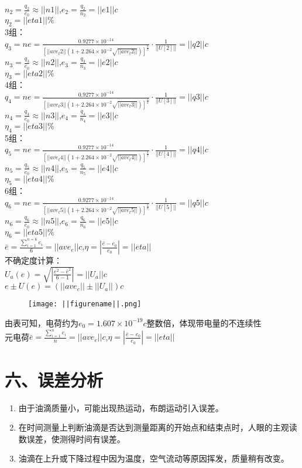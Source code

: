 \documentclass[11pt,a4paper,oneside]{article}
\begin{document}
\indent $n_2=\frac{q_2}{e_0}\approx||n1||$,\quad$e_2=\frac{q_2}{n_2}=||e1||c$\\
\indent $\eta_2=||eta1||\%$\\
3组：\\
\indent $q_{3}=ne=\frac{0.9277\times10^{-14}}
{\left[||ave_t2||\left(1+2.264\times10^{-2}\sqrt{||ave_t2||}\right)\right]^\frac{3}{2}}
\cdot\frac{1}{||U[2]||}=||q2||c$\\
\indent $n_3=\frac{q_3}{e_0}\approx||n2||$,\quad$e_3=\frac{q_3}{n_3}=||e2||c$\\
\indent $\eta_3=||eta2||\%$\\
4组：\\
\indent $q_{4}=ne=\frac{0.9277\times10^{-14}}
{\left[||ave_t3||\left(1+2.264\times10^{-2}\sqrt{||ave_t3||}\right)\right]^\frac{3}{2}}
\cdot\frac{1}{||U[3]||}=||q3||c$\\
\indent $n_4=\frac{q_4}{e_0}\approx||n3||$,\quad$e_4=\frac{q_4}{n_4}=||e3||c$\\
\indent $\eta_4=||eta3||\%$\\
5组：\\
\indent $q_{5}=ne=\frac{0.9277\times10^{-14}}
{\left[||ave_t4||\left(1+2.264\times10^{-2}\sqrt{||ave_t4||}\right)\right]^\frac{3}{2}}
\cdot\frac{1}{||U[4]||}=||q4||c$\\
\indent $n_5=\frac{q_5}{e_0}\approx||n4||$,\quad$e_5=\frac{q_5}{n_5}=||e4||c$\\
\indent $\eta_5=||eta4||\%$\\
6组：\\
\indent $q_{6}=ne=\frac{0.9277\times10^{-14}}
{\left[||ave_t5||\left(1+2.264\times10^{-2}\sqrt{||ave_t5||}\right)\right]^\frac{3}{2}}
\cdot\frac{1}{||U[5]||}=||q5||c$\\
\indent $n_6=\frac{q_6}{e_0}\approx||n5||$,\quad$e_6=\frac{q_6}{n_6}=||e5||c$\\
\indent $\eta_6=||eta5||\%$\\
$\bar{e}=\frac{\sum_{i=1}^{n=6} e_i}{6}=||ave_e||c$,\quad$\eta=|\frac{\bar{e}-e_0}{e_0}|=||eta||$\\
不确定度计算：\\
\indent $U_a(e)=\sqrt{|\frac{\bar{e^2}-\bar{e}^2}{6-1}|}=||U_a||c$\\
\indent $e±U(e)=\left(||ave_e||±||U_a||\right)c$\\
\begin{figure}[H]
\centering
  \texttt{[image: ||figurename||.png]}
\end{figure}
\indent 由表可知，电荷约为$e_0=1.607\times10^{-19}c$整数倍，体现带电量的不连续性\\
\indent 元电荷$\bar{e}=\frac{\sum_{i=1}^{n} e_i}{n}=||ave_e||c$,\quad$\eta=|\frac{\bar{e}-e_0}{e_0}|=||eta||$
\section*{六、误差分析}
\begin{enumerate}
\item 由于油滴质量小，可能出现热运动，布朗运动引入误差。
\item 在时间测量上判断油滴是否达到测量距离的开始点和结束点时，人眼的主观读数误差，使测得时间有误差。
\item 油滴在上升或下降过程中因为温度，空气流动等原因挥发，质量稍有改变。
\end{enumerate}
\end{document}
